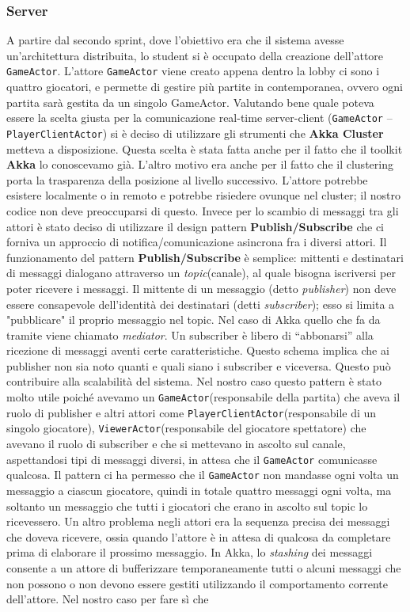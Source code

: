  \subsubsection{Server}\label{subsub:jakova:server}
A partire dal secondo sprint, dove l’obiettivo era che il sistema avesse un’architettura distribuita, lo student si è occupato della creazione dell’attore \texttt{GameActor}. L’attore \texttt{GameActor} viene creato appena dentro la lobby ci sono i quattro giocatori, e permette di gestire più partite in contemporanea, ovvero ogni partita sarà gestita da un singolo GameActor. Valutando bene quale poteva essere la scelta giusta per la comunicazione real-time server-client (\texttt{GameActor} – \texttt{PlayerClientActor}) si è deciso di utilizzare gli strumenti che \textbf{Akka Cluster} metteva a disposizione. Questa scelta è stata fatta anche per il fatto che il toolkit \textbf{Akka} lo conoscevamo già. L’altro motivo era anche per il fatto che il clustering porta la trasparenza della posizione al livello successivo. L'attore potrebbe esistere localmente o in remoto e potrebbe risiedere ovunque nel cluster; il nostro codice non deve preoccuparsi di questo. Invece per lo scambio di messaggi tra gli attori è stato deciso di utilizzare il design pattern \textbf{Publish/Subscribe} che ci forniva un approccio di notifica/comunicazione asincrona fra i diversi attori. Il funzionamento del pattern \textbf{Publish/Subscribe} è semplice: mittenti e destinatari di messaggi dialogano attraverso un \textit{topic}(canale), al quale bisogna iscriversi per poter ricevere i messaggi. Il mittente di un messaggio (detto \textit{publisher}) non deve essere consapevole dell'identità dei destinatari (detti \textit{subscriber}); esso si limita a "pubblicare" il proprio messaggio nel topic. Nel caso di Akka quello che fa da tramite viene chiamato \textit{mediator}. Un subscriber è libero di “abbonarsi” alla ricezione di messaggi aventi certe caratteristiche. Questo schema implica che ai publisher non sia noto quanti e quali siano i subscriber e viceversa. Questo può contribuire alla scalabilità del sistema. Nel nostro caso questo pattern è stato molto utile poiché avevamo un \texttt{GameActor}(responsabile della partita) che aveva il ruolo di publisher e altri attori come \texttt{PlayerClientActor}(responsabile di un singolo giocatore), \texttt{ViewerActor}(responsabile del giocatore spettatore) che avevano il ruolo di subscriber e che si mettevano in ascolto sul canale, aspettandosi tipi di messaggi diversi, in attesa che il \texttt{GameActor} comunicasse qualcosa. Il pattern ci ha permesso che il \texttt{GameActor} non mandasse ogni volta un messaggio a ciascun giocatore, quindi in totale quattro messaggi ogni volta, ma soltanto un messaggio che tutti i giocatori che erano in ascolto sul topic lo ricevessero. Un altro problema negli attori era la sequenza precisa dei messaggi che doveva ricevere, ossia quando l'attore è in attesa di qualcosa da completare prima di elaborare il prossimo messaggio. In Akka, lo \textit{stashing} dei messaggi consente a un attore di bufferizzare temporaneamente tutti o alcuni messaggi che non possono o non devono essere gestiti utilizzando il comportamento corrente dell'attore. Nel nostro caso per fare sì che 